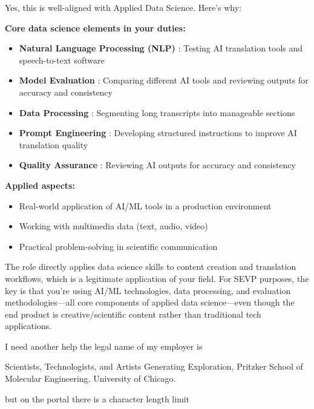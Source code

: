 \begin{botresponse}
Yes, this is well-aligned with Applied Data Science. Here's why:

\textbf{Core data science elements in your duties:}

\begin{itemize}
\item \textbf{Natural Language Processing (NLP)} : Testing AI translation tools and speech-to-text software
\item \textbf{Model Evaluation} : Comparing different AI tools and reviewing outputs for accuracy and consistency
\item \textbf{Data Processing} : Segmenting long transcripts into manageable sections
\item \textbf{Prompt Engineering} : Developing structured instructions to improve AI translation quality
\item \textbf{Quality Assurance} : Reviewing AI outputs for accuracy and consistency
\end{itemize}

\textbf{Applied aspects:}

\begin{itemize}
\item Real-world application of AI/ML tools in a production environment
\item Working with multimedia data (text, audio, video)
\item Practical problem-solving in scientific communication
\end{itemize}

The role directly applies data science skills to content creation and translation workflows, which is a legitimate application of your field. For SEVP purposes, the key is that you're using AI/ML technologies, data processing, and evaluation methodologies—all core components of applied data science—even though the end product is creative/scientific content rather than traditional tech applications.
\end{botresponse}

\begin{userprompt}
I need another help the legal name of my employer is

Scientists, Technologists, and Artists Generating Exploration, Pritzker School of Molecular Engineering, University of Chicago.

but on the portal there is a character length limit
\end{userprompt}

